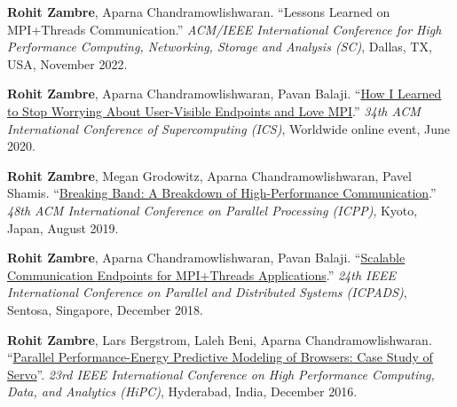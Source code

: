 \documentclass[11pt,article,oneside]{memoir}
\begin{document}
\begin{etaremune}

\item \textbf{Rohit Zambre}, Aparna Chandramowlishwaran. ``Lessons Learned on MPI+Threads Communication.'' \emph{ACM/IEEE International Conference for High Performance Computing, Networking, Storage and Analysis (SC)}, Dallas, TX, USA, November 2022.

\item \textbf{Rohit Zambre}, Aparna Chandramowlishwaran, Pavan Balaji. ``\href{https://doi.org/10.1145/3392717.3392773}{How I Learned to Stop Worrying About User-Visible Endpoints and Love MPI}.'' \emph{34th ACM International Conference of Supercomputing (ICS)}, Worldwide online event, June 2020.

\item \textbf{Rohit Zambre}, Megan Grodowitz, Aparna Chandramowlishwaran, Pavel Shamis. ``\href{https://doi.org/10.1145/3337821.3337910}{Breaking Band: A Breakdown of High-Performance Communication}.'' \emph{48th ACM International Conference on Parallel Processing (ICPP)}, Kyoto, Japan, August 2019.

\item \textbf{Rohit Zambre}, Aparna Chandramowlishwaran, Pavan Balaji. ``\href{https://doi.org/10.1109/PADSW.2018.8645059}{Scalable Communication Endpoints for MPI+Threads Applications}.'' \emph{24th IEEE International Conference on Parallel and Distributed Systems (ICPADS)}, Sentosa, Singapore, December 2018.

\item \textbf{Rohit Zambre}, Lars Bergstrom, Laleh Beni, Aparna Chandramowlishwaran. ``\href{https://doi.org/10.1109/HiPC.2016.013}{Parallel Performance-Energy Predictive Modeling of Browsers: Case Study of Servo}''. \emph{23rd IEEE International Conference on High Performance Computing, Data, and Analytics (HiPC)}, Hyderabad, India, December 2016.
 
\end{etaremune}
\pagebreak

\medskip

\def\labelprefix{P}
\end{document}
